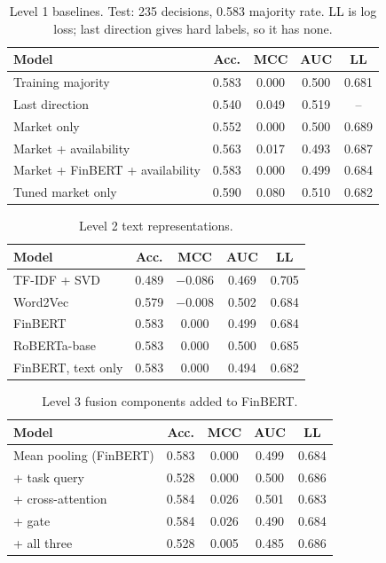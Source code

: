 \newcommand{\abhead}{%
    \toprule
    Model & Acc. & MCC & AUC & LL \\
    \midrule}

\begin{table}[t]
    \caption{Level 1 baselines. Test: 235 decisions, 0.583 majority rate. LL is log loss; last direction gives hard labels, so it has none.}
    \label{tab:level1}
    \centering
    \scriptsize
    \setlength{\tabcolsep}{4pt}
    \begin{tabular}{lcccc}
        \abhead
        Training majority & 0.583 & 0.000 & 0.500 & 0.681 \\
        Last direction & 0.540 & 0.049 & 0.519 & -- \\
        Market only & 0.552 & 0.000 & 0.500 & 0.689 \\
        Market + availability & 0.563 & 0.017 & 0.493 & 0.687 \\
        Market + FinBERT + availability & 0.583 & 0.000 & 0.499 & 0.684 \\
        Tuned market only & 0.590 & 0.080 & 0.510 & 0.682 \\
        \bottomrule
    \end{tabular}
\end{table}

\begin{table}[t]
    \caption{Level 2 text representations.}
    \label{tab:level2}
    \centering
    \scriptsize
    \setlength{\tabcolsep}{4pt}
    \begin{tabular}{lcccc}
        \abhead
        TF-IDF + SVD & 0.489 & $-$0.086 & 0.469 & 0.705 \\
        Word2Vec & 0.579 & $-$0.008 & 0.502 & 0.684 \\
        FinBERT & 0.583 & 0.000 & 0.499 & 0.684 \\
        RoBERTa-base & 0.583 & 0.000 & 0.500 & 0.685 \\
        FinBERT, text only & 0.583 & 0.000 & 0.494 & 0.682 \\
        \bottomrule
    \end{tabular}
\end{table}

\begin{table}[t]
    \caption{Level 3 fusion components added to FinBERT.}
    \label{tab:level3}
    \centering
    \scriptsize
    \setlength{\tabcolsep}{4pt}
    \begin{tabular}{lcccc}
        \abhead
        Mean pooling (FinBERT) & 0.583 & 0.000 & 0.499 & 0.684 \\
        + task query & 0.528 & 0.000 & 0.500 & 0.686 \\
        + cross-attention & 0.584 & 0.026 & 0.501 & 0.683 \\
        + gate & 0.584 & 0.026 & 0.490 & 0.684 \\
        + all three & 0.528 & 0.005 & 0.485 & 0.686 \\
        \bottomrule
    \end{tabular}
\end{table}
